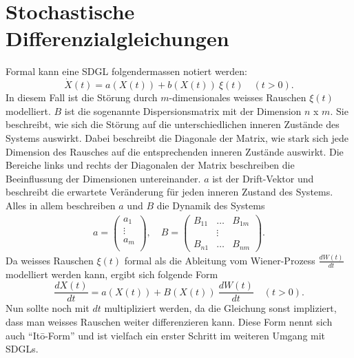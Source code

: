 %
%
%
%

\section{Stochastische Differenzialgleichungen\label{brown:SDGL}}

Formal kann eine SDGL folgendermassen notiert werden: 
\begin{equation}
	\label{brown:SDGL:whiteNoise}
	\dot{X}(t) = a(X(t)) + b(X(t)) \ \xi(t) \quad (t>0).
\end{equation}
In diesem Fall ist die Störung durch $ m $-dimensionales weisses Rauschen $ \xi(t) $ modelliert. $ B $ ist die sogenannte Dispersionsmatrix mit der Dimension $ n $ x $ m $. Sie beschreibt, wie sich die Störung auf die unterschiedlichen inneren Zustände des Systems auswirkt. Dabei beschreibt die Diagonale der Matrix, wie stark sich jede Dimension des Rausches auf die entsprechenden inneren Zustände auswirkt. Die Bereiche links und rechts der Diagonalen der Matrix beschreiben die Beeinflussung der Dimensionen untereinander. $ a $ ist der Drift-Vektor und beschreibt die erwartete Veränderung für jeden inneren Zustand des Systems. Alles in allem beschreiben $ a $ und $ B $ die Dynamik des Systems
\begin{align*}
	a = 
	\begin{pmatrix}
		a_{1} \\
		\vdots \\
		a_{m}\\ 
	\end{pmatrix}
	, \quad
	B = 
	\begin{pmatrix}
		B_{11} & \dots & B_{1m} \\
		& \vdots & \\
		B_{n1} & \dots & B_{nm} 
	\end{pmatrix}.
\end{align*}
Da weisses Rauschen $ \xi(t) $ formal als die Ableitung vom Wiener-Prozess $ \frac{dW(t)}{dt} $ modelliert werden kann, ergibt sich folgende Form
\begin{equation}
	\frac{dX(t)}{dt} = a(X(t)) + B(X(t)) \ \frac{dW(t)}{dt} \quad (t>0).
\end{equation}
Nun sollte noch mit $ dt $  multipliziert werden, da die Gleichung sonst impliziert, dass man weisses Rauschen weiter differenzieren kann. Diese Form nennt sich auch ``Itō-Form'' und ist vielfach ein erster Schritt im weiteren Umgang mit SDGLs.
